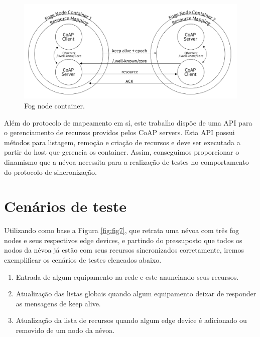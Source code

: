 \begin{figure}[H]
    \centering\includegraphics[width=.8\textwidth]{fig13.png}
    \caption [Fog node container]
    {\label{fig:fig13} Fog node container.}
\end{figure}


Além do protocolo de mapeamento em sí, este trabalho dispõe de uma API para o gerenciamento de recursos providos pelos CoAP servers.
Esta API possui métodos para listagem, remoção e criação de recursos e deve ser executada a partir do host que gerencia os container.
Assim, conseguimos proporcionar o dinamismo que a névoa necessita para a realização de testes no comportamento do protocolo de sincronização.


\section{Cenários de teste}

Utilizando como base a Figura \ref{fig:fig7}, que retrata uma névoa com três fog nodes e seus respectivos edge devices, e partindo do pressuposto que todos os nodos da névoa já estão com seus recursos sincronizados corretamente,
iremos exemplificar os cenários de testes elencados abaixo.

\begin{enumerate}
    \item Entrada de algum equipamento na rede e este anunciando seus recursos. 
    \item Atualização das listas globais quando algum equipamento deixar de responder as mensagens de keep alive.
    \item Atualização da lista de recursos quando algum edge device é adicionado ou removido de um nodo da névoa.
\end{enumerate}

